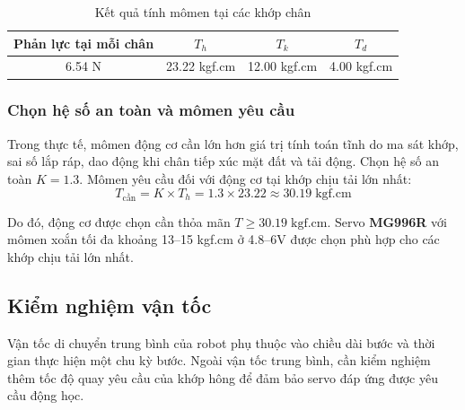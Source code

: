             \begin{table}[H]
            \centering
            \caption{Kết quả tính mômen tại các khớp chân}
            \begin{tabular}{|c|c|c|c|}
            \hline
            \textbf{Phản lực tại mỗi chân} & \boldmath$T_h$ & \boldmath$T_k$ & \boldmath$T_d$ \\
            \hline
            6.54 N & 23.22 kgf.cm & 12.00 kgf.cm & 4.00 kgf.cm \\
            \hline
            \end{tabular}
            \end{table}

            \subsubsection{Chọn hệ số an toàn và mômen yêu cầu}

            \hspace{0.5cm} Trong thực tế, mômen động cơ cần lớn hơn giá trị tính toán tĩnh do ma sát khớp, sai số lắp ráp, dao động khi chân tiếp xúc mặt đất và tải động. Chọn hệ số an toàn $K = 1.3$. Mômen yêu cầu đối với động cơ tại khớp chịu tải lớn nhất:
            \begin{equation}
                T_\text{cần} = K \times T_h = 1.3 \times 23.22 \approx 30.19\;\text{kgf.cm}
            \end{equation}

            \hspace{0.5cm} Do đó, động cơ được chọn cần thỏa mãn $T \geq 30.19\;\text{kgf.cm}$. Servo \textbf{MG996R} với mômen xoắn tối đa khoảng 13--15 kgf.cm ở 4.8--6V được chọn phù hợp cho các khớp chịu tải lớn nhất.

        \subsection{Kiểm nghiệm vận tốc}

            \hspace{0.5cm} Vận tốc di chuyển trung bình của robot phụ thuộc vào chiều dài bước và thời gian thực hiện một chu kỳ bước. Ngoài vận tốc trung bình, cần kiểm nghiệm thêm tốc độ quay yêu cầu của khớp hông để đảm bảo servo đáp ứng được yêu cầu động học.

